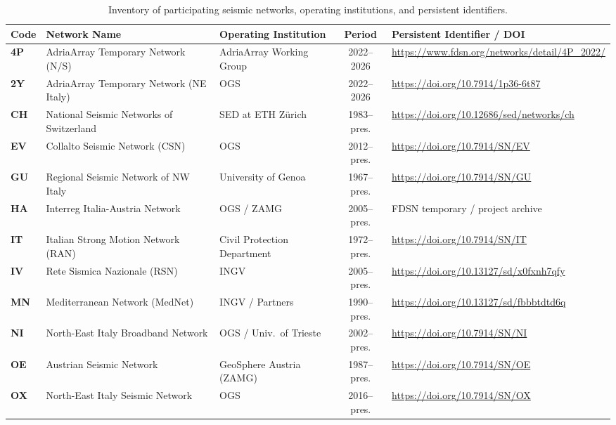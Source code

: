 \begin{table}[htbp]
  \centering
  \small
  \caption{Inventory of participating seismic networks, operating institutions, and persistent identifiers.}
  \label{tab:network_inventory}
  \begin{threeparttable}
    \begin{tabularx}{\linewidth}{l l l c X}
      \toprule
      \textbf{Code} & \textbf{Network Name} & \textbf{Operating Institution} & \textbf{Period} & \textbf{Persistent Identifier / DOI} \\
      \midrule
      \textbf{4P} & AdriaArray Temporary Network (N/S) & AdriaArray Working Group & 2022--2026 & \url{https://www.fdsn.org/networks/detail/4P_2022/} \\
      \textbf{2Y} & AdriaArray Temporary Network (NE Italy) & OGS & 2022--2026 & \url{https://doi.org/10.7914/1p36-6t87} \\
      \textbf{CH} & National Seismic Networks of Switzerland & SED at ETH Z\"urich & 1983--pres. & \url{https://doi.org/10.12686/sed/networks/ch} \\
      \textbf{EV} & Collalto Seismic Network (CSN) & OGS & 2012--pres. & \url{https://doi.org/10.7914/SN/EV} \\
      \textbf{GU} & Regional Seismic Network of NW Italy & University of Genoa & 1967--pres. & \url{https://doi.org/10.7914/SN/GU} \\
      \textbf{HA} & Interreg Italia-Austria Network & OGS / ZAMG & 2005--pres. & FDSN temporary / project archive \\
      \textbf{IT} & Italian Strong Motion Network (RAN) & Civil Protection Department & 1972--pres. & \url{https://doi.org/10.7914/SN/IT} \\
      \textbf{IV} & Rete Sismica Nazionale (RSN) & INGV & 2005--pres. & \url{https://doi.org/10.13127/sd/x0fxnh7qfy} \\
      \textbf{MN} & Mediterranean Network (MedNet) & INGV / Partners & 1990--pres. & \url{https://doi.org/10.13127/sd/fbbbtdtd6q} \\
      \textbf{NI} & North-East Italy Broadband Network & OGS / Univ.\ of Trieste & 2002--pres. & \url{https://doi.org/10.7914/SN/NI} \\
      \textbf{OE} & Austrian Seismic Network & GeoSphere Austria (ZAMG) & 1987--pres. & \url{https://doi.org/10.7914/SN/OE} \\
      \textbf{OX} & North-East Italy Seismic Network & OGS & 2016--pres. & \url{https://doi.org/10.7914/SN/OX} \\

\end{tabularx}
\end{threeparttable}
\end{table}
